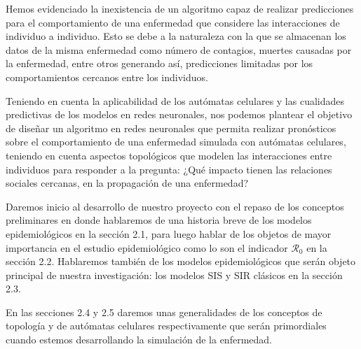 Hemos evidenciado la inexistencia de un algoritmo capaz de realizar predicciones para el comportamiento de una enfermedad que considere las interacciones de individuo a individuo. Esto se debe a la naturaleza con la que se almacenan los datos de la misma enfermedad como número de contagios, muertes causadas por la enfermedad, entre otros generando así, predicciones limitadas por los comportamientos cercanos entre los individuos. 

Teniendo en cuenta la aplicabilidad de los autómatas celulares y las cualidades predictivas de los modelos en redes neuronales, nos podemos plantear el objetivo de diseñar un algoritmo en redes neuronales que permita realizar pronósticos sobre el comportamiento de una enfermedad simulada con autómatas celulares, teniendo en cuenta aspectos topológicos que modelen las interacciones entre individuos para responder a la pregunta: ¿Qué impacto tienen las relaciones sociales cercanas, en la propagación de una enfermedad?

Daremos inicio al desarrollo de nuestro proyecto con el repaso de los conceptos preliminares en donde hablaremos de una historia breve de los modelos epidemiológicos en la sección 2.1, para luego hablar de los objetos de mayor importancia en el estudio epidemiológico como lo son el indicador $\mathcal{R}_0$ en la sección 2.2. Hablaremos también de los modelos epidemiológicos que serán objeto principal de nuestra investigación: los modelos SIS y SIR clásicos en la sección 2.3.

En las secciones 2.4 y 2.5 daremos unas generalidades de los conceptos de topología y de autómatas celulares respectivamente que serán primordiales cuando estemos desarrollando la simulación de la enfermedad.

